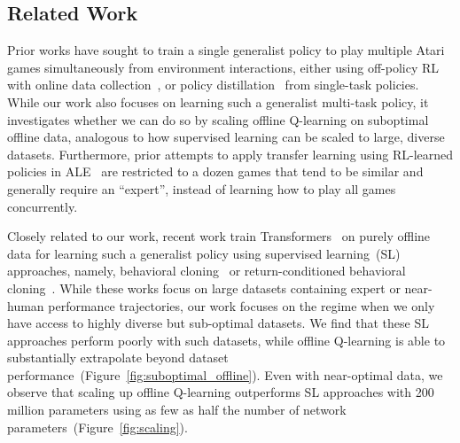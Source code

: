 \vspace{-0.2cm}
\subsection{Related Work}
\vspace{-0.2cm}


Prior works have sought to train a single generalist policy to play multiple Atari games simultaneously from environment interactions, either using off-policy RL with online data collection~\citep{espeholt2018impala, hessel2019multi, song2019v}, or policy distillation~\citep{teh2017distral, rusu2015policy} from single-task policies. While our work also focuses on learning such a generalist multi-task policy, it investigates whether we can do so by scaling offline Q-learning on suboptimal offline data, analogous to how supervised learning can be scaled to large, diverse datasets. Furthermore, prior attempts to apply transfer learning using RL-learned policies in ALE~\citep{rusu2015policy, parisotto2015actor, mittel2019visual} are restricted to a dozen games that tend to be similar and generally require an “expert”, instead of learning how to play all games concurrently. 

Closely related to our work, recent work train Transformers~\citep{vaswani2017attention} on purely offline data for learning such a generalist policy using supervised learning~(SL) approaches, namely, behavioral cloning~\citep{reed2022generalist} or return-conditioned behavioral cloning~\citep{lee2022multi}. While these works focus on large datasets containing expert or near-human performance trajectories, our work focuses on the regime when we only have access to highly diverse but sub-optimal datasets. We find that these SL approaches perform poorly with such datasets, while offline Q-learning is able to substantially extrapolate beyond dataset performance~(Figure~\ref{fig:suboptimal_offline}). Even with near-optimal data, we observe that scaling up offline Q-learning outperforms  SL approaches with 200 million parameters using as few as half the number of network parameters~(Figure~\ref{fig:scaling}).


